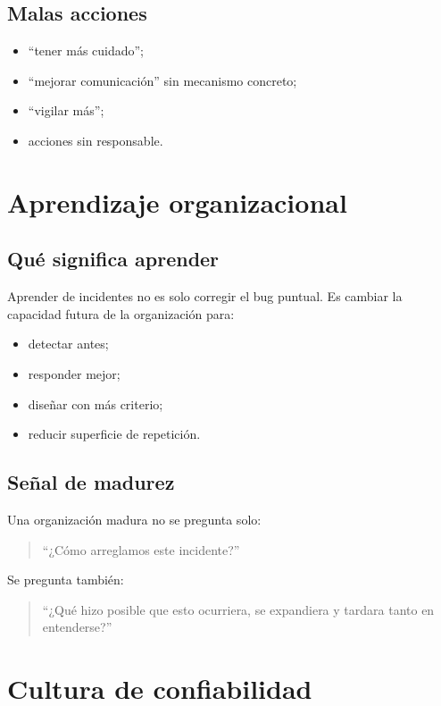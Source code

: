 \documentclass[variant=apuntes,cover=institutional,mode=screen]{ua-engineering-v6-article}
\begin{document}
\subsection{Malas acciones}

\begin{itemize}
\item “tener más cuidado”;
\item “mejorar comunicación” sin mecanismo concreto;
\item “vigilar más”;
\item acciones sin responsable.
\end{itemize}

\section{Aprendizaje organizacional}

\subsection{Qué significa aprender}

Aprender de incidentes no es solo corregir el bug puntual. Es cambiar la capacidad futura de la organización para:
\begin{itemize}
\item detectar antes;
\item responder mejor;
\item diseñar con más criterio;
\item reducir superficie de repetición.
\end{itemize}

\subsection{Señal de madurez}

Una organización madura no se pregunta solo:
\begin{quote}
“¿Cómo arreglamos este incidente?”
\end{quote}

Se pregunta también:
\begin{quote}
“¿Qué hizo posible que esto ocurriera, se expandiera y tardara tanto en entenderse?”
\end{quote}

\section{Cultura de confiabilidad}
\end{document}
